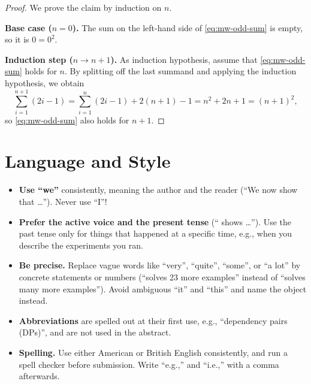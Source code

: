 \begin{proof}
    We prove the claim by induction on $n$.

    \textbf{Base case ($n = 0$).}
    The sum on the left-hand side of \cref{eq:mw-odd-sum} is empty, so it is
    $0 = 0^2$.

    \textbf{Induction step ($n \to n + 1$).}
    As induction hypothesis, assume that \cref{eq:mw-odd-sum} holds for $n$.
    By splitting off the last summand and applying the induction hypothesis,
    we obtain
    \begin{equation*}
        \sum_{i=1}^{n+1} (2i - 1)
        = \sum_{i=1}^{n} (2i - 1) + 2(n + 1) - 1
        = n^2 + 2n + 1
        = (n + 1)^2,
    \end{equation*}
    so \cref{eq:mw-odd-sum} also holds for $n + 1$.
\end{proof}

\section{Language and Style}\label{sec:mw-language}

\begin{itemize}
    \item \textbf{Use ``we''} consistently, meaning the author and the reader
          (``We now show that \ldots'').
          Never use ``I''!
    \item \textbf{Prefer the active voice and the present tense}
          (`` shows \ldots'').
          Use the past tense only for things that happened at a specific
          time, e.g., when you describe the experiments you ran.
    \item \textbf{Be precise.}
          Replace vague words like ``very'', ``quite'', ``some'', or ``a lot''
          by concrete statements or numbers
          (``solves 23 more examples'' instead of ``solves many more
          examples'').
          Avoid ambiguous ``it'' and ``this'' and name the object instead.
    \item \textbf{Abbreviations} are spelled out at their first use, e.g.,
          ``dependency pairs (DPs)'', and are not used in the abstract.
    \item \textbf{Spelling.}
          Use either American or British English consistently, and run a
          spell checker before submission.
          Write ``e.g.,'' and ``i.e.,'' with a comma afterwards.
\end{itemize}

